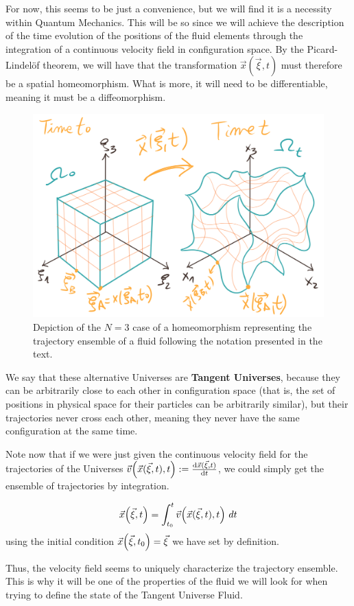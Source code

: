 \documentclass[11pt, a4paper]{article} %
\begin{document}
For now, this seems to be just a convenience, but we will find it is a necessity within Quantum Mechanics. This will be so since we will achieve the description of the time evolution of the positions of the fluid elements through the integration of a continuous velocity field in configuration space. By the Picard-Lindelöf theorem, we will have that the transformation $\vec{x}(\vec{\xi},t)$ must therefore be a spatial homeomorphism. What is more, it will need to be differentiable, meaning it must be a diffeomorphism.


\begin{figure}[h!]
  \centering
    \includegraphics[width=0.57\linewidth]{1deforma.png}
  \caption{Depiction of the $N=3$ case of a homeomorphism representing the trajectory ensemble of a fluid following the notation presented in the text. \vspace{-0.2cm}}
  \label{fig:deform}
\end{figure}

We say that these alternative Universes are {\bf Tangent Universes}, because they can be arbitrarily close to each other in configuration space (that is, the set of positions in physical space for their particles can be arbitrarily similar), but their trajectories never cross each other, meaning they never have the same configuration at the same time.

\newpage
Note now that if we were just given the continuous velocity field for the trajectories of the Universes $\vec{v}\qty(\vec{x}(\vec{\xi},t),t):=\dv{\vec{x}(\vec{\xi},t)}{t}$, we could simply get the ensemble of trajectories by integration.

\begin{equation}
\vec{x}\qty(\vec{\xi},t)=\int_{t_0}^t \vec{v}\qty(\vec{x}(\vec{\xi},t),t)\ dt
\end{equation}
using the initial condition $\vec{x}\qty(\vec{\xi},t_0)=\vec{\xi}$ we have set by definition.

Thus, the velocity field seems to uniquely characterize the trajectory ensemble. This is why it will be one of the properties of the fluid we will look for when trying to define the state of the Tangent Universe Fluid.
\end{document}
